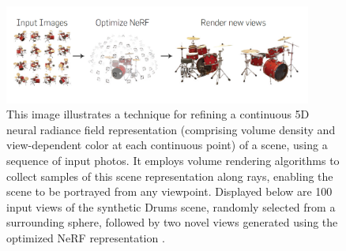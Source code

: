 \begin{figure}[H]
  \centering
  \includegraphics[width=0.9\textwidth]{Figures/Optimized NeRF.PNG}
  \caption[Illustration of Optimized NeRF]{This image illustrates a technique for refining a continuous 5D neural radiance field representation (comprising volume density and view-dependent color at each continuous point) of a scene, using a sequence of input photos. It employs volume rendering algorithms to collect samples of this scene representation along rays, enabling the scene to be portrayed from any viewpoint. Displayed below are 100 input views of the synthetic Drums scene, randomly selected from a surrounding sphere, followed by two novel views generated using the optimized NeRF representation \cite{mildenhall2021nerf}.}
  \label{fig:Optimized NeRF}
\end{figure}

